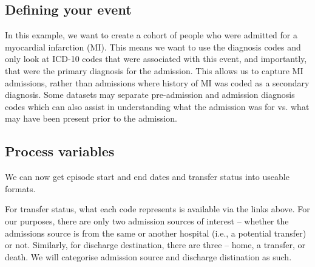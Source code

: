 \documentclass[11pt]{article}
\begin{document}
\clearpage
\subsection{Defining your event}
In this example, we want to create a cohort of people who were admitted for a myocardial infarction (MI). 
This means we want to use the diagnosis codes and only look at ICD-10 codes that were associated with this event, 
and importantly, that were the primary diagnosis for the admission. 
This allows us to capture MI admissions, rather than admissions where history of MI was coded as a secondary diagnosis. 
Some datasets may separate pre-admission and admission diagnosis codes which can also assist in understanding what 
the admission was for vs. what may have been present prior to the admission. 

\color{Blue4}
\begin{stlog}\end{stlog}
\color{black}

\clearpage
\subsection{Process variables}

We can now get episode start and end dates 
and transfer status into useable formats. 

For transfer status, what each code represents is available via the links
above. For our purposes, there are only two admission sources of interest
-- whether the admissions source is from the same or another hospital (i.e., a potential transfer) or not. 
Similarly, for discharge destination, there are three -- home, a transfer, or death. 
We will categorise admission source and discharge distination as such. 
\end{document}
